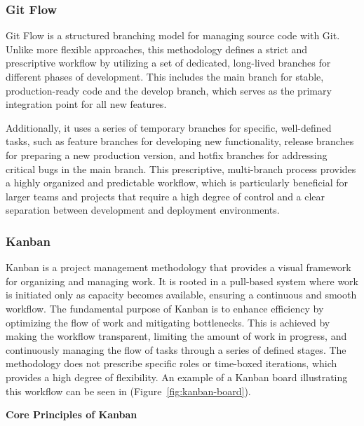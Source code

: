 \subsubsection{Git Flow}
\label{subsubsection:Git Flow}
Git Flow \cite{atlassian2025gitflow} is a structured branching model for managing source code with Git. Unlike more flexible approaches, this methodology defines a strict and prescriptive workflow by utilizing a set of dedicated, long-lived branches for different phases of development. This includes the main branch for stable, production-ready code and the develop branch, which serves as the primary integration point for all new features. 

Additionally, it uses a series of temporary branches for specific, well-defined tasks, such as feature branches for developing new functionality, release branches for preparing a new production version, and hotfix branches for addressing critical bugs in the main branch. This prescriptive, multi-branch process provides a highly organized and predictable workflow, which is particularly beneficial for larger teams and projects that require a high degree of control and a clear separation between development and deployment environments.

\subsubsection{Kanban}
Kanban \cite{planview2025kanban} is a project management methodology that provides a visual framework for organizing and managing work. It is rooted in a pull-based system where work is initiated only as capacity becomes available, ensuring a continuous and smooth workflow. The fundamental purpose of Kanban is to enhance efficiency by optimizing the flow of work and mitigating bottlenecks. This is achieved by making the workflow transparent, limiting the amount of work in progress, and continuously managing the flow of tasks through a series of defined stages. The methodology does not prescribe specific roles or time-boxed iterations, which provides a high degree of flexibility. An example of a Kanban board illustrating this workflow can be seen in (Figure~\ref{fig:kanban-board}).

\textbf{Core Principles of Kanban}

